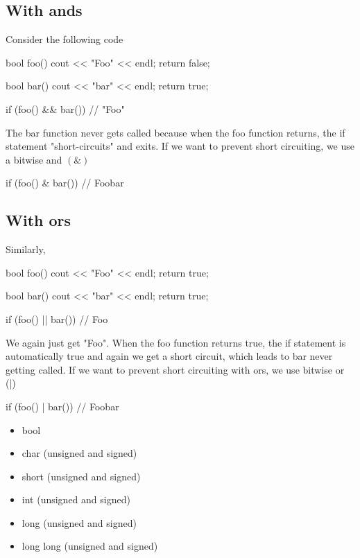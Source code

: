 \documentclass{report}
\begin{document}
    \subsection{With ands}
    \bigbreak \noindent 
    Consider the following code
    \bigbreak \noindent 
    \begin{cppcode}
        bool foo() {
            cout << "Foo" << endl;
            return false;
        }

        bool bar() {
            cout << "bar" << endl;
            return true;
        }

        if (foo() && bar()) // "Foo"
    \end{cppcode}
    \bigbreak \noindent 
    The bar function never gets called because when the foo function returns, the if statement "short-circuits" and exits. If we want to prevent short circuiting, we use a bitwise and $(\&)$
    \bigbreak \noindent 
    \begin{cppcode}
    if (foo() & bar()) // Foo\n bar
    \end{cppcode}
    \bigbreak \noindent 
    \subsection{With ors}
    \bigbreak \noindent 
    Similarly, 
    \bigbreak \noindent 
    \begin{cppcode}
        bool foo() {
            cout << "Foo" << endl;
            return true;
        }

        bool bar() {
            cout << "bar" << endl;
            return true;
        }

        if (foo() || bar()) // Foo
    \end{cppcode}
    \bigbreak \noindent 
    We again just get "Foo". When the foo function returns true, the if statement is automatically true and again we get a short circuit, which leads to bar never getting called.  If we want to prevent short circuiting with ors, we use bitwise or (|)
    \bigbreak \noindent 
    \begin{cppcode}
    if (foo() | bar()) // Foo\n bar
    \end{cppcode}

    \pagebreak 
    \bigbreak \noindent 
    \begin{itemize}
        \item bool
        \item char (unsigned and signed)
        \item short (unsigned and signed)
        \item int (unsigned and signed)
        \item long (unsigned and signed)
        \item long long (unsigned and signed)
    \end{itemize}
\end{document}
